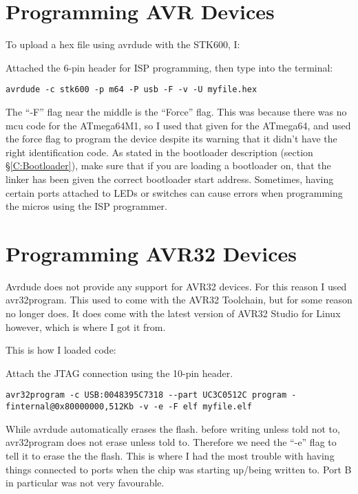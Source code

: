 \documentclass[a4paper, oneside, 11pt, titlepage, onecolumn, openright]{report}
\begin{document}
{\section{Programming AVR Devices}
			\label{s:STK600AVRDevices}
			To upload a hex file using avrdude with the STK600, I:\newline
			
			Attached the 6-pin header for ISP programming, then type into the terminal:
			
\begin{lstlisting}[frame=trBL, breaklines=true]
 avrdude -c stk600 -p m64 -P usb -F -v -U myfile.hex 
\end{lstlisting}

			The ``-F'' flag near the middle is the ``Force'' flag. This was because there was no mcu code for the ATmega64M1, so I used that given for the ATmega64, and used the force flag to program the device despite its warning that it didn't have the right identification code. \newline
			As stated in the bootloader description (section \S\ref{C:Bootloader}), make sure that if you are loading a bootloader on, that the linker has been given the correct bootloader start address.\newline
			Sometimes, having certain ports attached to LEDs or switches can cause errors when programming the micros using the ISP programmer.
			
			
\section{Programming AVR32 Devices}
			\label{s:STK600AVR32Devices}
			Avrdude does not provide any support for AVR32 devices. For this reason I used avr32program. This used to come with the AVR32 Toolchain, but for some reason no longer does. It does come with the latest version of AVR32 Studio for Linux however, which is where I got it from.

			This is how I loaded code:\newline
			
			Attach the JTAG connection using the 10-pin header.
 						
\begin{lstlisting}[frame=trBL, breaklines=true]
avr32program -c USB:0048395C7318 --part UC3C0512C program -finternal@0x80000000,512Kb -v -e -F elf myfile.elf
\end{lstlisting}			
			 
			 While avrdude automatically erases the flash. before writing unless told not to, avr32program does not erase unless told to. Therefore we need the ``-e'' flag to tell it to erase the the flash.\newline
			 This is where I had the most trouble with having things connected to ports when the chip was starting up/being written to. Port B in particular was not very favourable.


}
\end{document}

